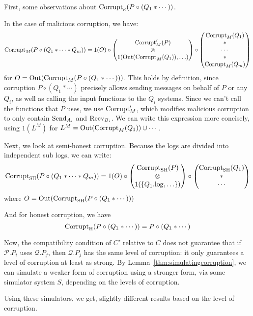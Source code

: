 \begin{theorem}
First, some observations about $\text{Corrupt}_\kappa(P \circ (Q_1 * \cdots))$.

In the case of malicious corruption, we have:
$$
\text{Corrupt}_M(P \circ (Q_1 * \cdots * Q_m)) =
1(O) \circ
\begin{pmatrix}
  \text{Corrupt}'_M(P)\cr
  \otimes\cr
  1(\text{Out}(\text{Corrupt}_M(Q_1)), \ldots)\cr
\end{pmatrix}
\circ
\begin{pmatrix}
  \text{Corrupt}_M(Q_1)\cr
  *\cr
  \cdots\cr
  *\cr
  \text{Corrupt}_M(Q_m)\cr
\end{pmatrix}
$$
for $O = \text{Out}(\text{Corrupt}_M(P \circ (Q_1 * \cdots)))$.
This holds by definition, since corruption $P \circ (Q_1 * \cdots)$ precisely allows
sending messages on behalf of $P$ or any $Q_i$, as well as calling
the input functions to the $Q_i$ systems.
Since we can't call the functions that $P$ uses,
we use $\text{Corrupt}'_{M}$, which modifies malicious corruption to only
contain $\text{Send}_{A_i}$ and $\text{Recv}_{B_i}$.
We can write this expression more concisely,
using $1(L^M)$ for $L^M = \text{Out}(\text{Corrupt}_M(Q_1)) \cup \cdots$.

Next, we look at semi-honest corruption.
Because the logs are divided into independent sub logs, we can write:
$$
\text{Corrupt}_{\text{SH}}(P \circ (Q_1 * \cdots * Q_m)) =
1(O) \circ
\begin{pmatrix}
  \text{Corrupt}_{\text{SH}}(P)\cr
  \otimes\cr
  1(\{Q_1.\text{log}, \ldots\})
\end{pmatrix}
\circ
\begin{pmatrix}
  \text{Corrupt}_{\text{SH}}(Q_1)\cr
  *\cr
  \cdots
\end{pmatrix}
$$
where $O = \text{Out}(\text{Corrupt}_{\text{SH}}(P \circ (Q_1 * \cdots)))$

And for honest corruption, we have
$$
\text{Corrupt}_{\text{H}}(P \circ (Q_1 * \cdots)) = P \circ (Q_1 * \cdots)
$$

Now, the compatibility condition of $C'$ relative to $C$
does not guarantee that if $\mathcal{P}.P_i$ uses $\mathcal{Q}.P_j$,
then $\mathcal{Q}.P_j$ has the same level of corruption: 
it only guarantees a level of corruption at least as strong.
By Lemma~\ref{thm:simulatingcorruption}, we can simulate a weaker
form of corruption using a stronger form, via some simulator system $S$,
depending on the levels of corruption.

Using these simulators, we get, slightly different results based
on the level of corruption.


\end{theorem}
